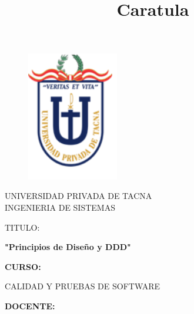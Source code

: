 \documentclass[12pt,letterpaper]{article}
\begin{document}
\title{Caratula}
\begin{titlepage}
\begin{figure}[htb]
\begin{center}
\includegraphics[width=4cm]{./Imagenes/logo.png}
\end{center}
\end{figure}
\vspace*{-0.25in}
\begin{center}
\large{UNIVERSIDAD PRIVADA DE TACNA}\\
\vspace*{-0.025in}
INGENIERIA DE SISTEMAS  \\

\vspace*{0.5in}
\begin{large}
TITULO:\\
\end{large}

\vspace*{0.1in}
\begin{Large}

\textbf{"Principios de Diseño y DDD"} \\
\end{Large}

\vspace*{0.3in}
\begin{Large}
\textbf{CURSO:} \\
\end{Large}

\vspace*{0.1in}
\begin{large}
CALIDAD Y PRUEBAS DE SOFTWARE\\
\end{large}

\vspace*{0.3in}
\begin{Large}
\textbf{DOCENTE:} \\
\end{Large}


\end{center}
\end{titlepage}
\end{document}
